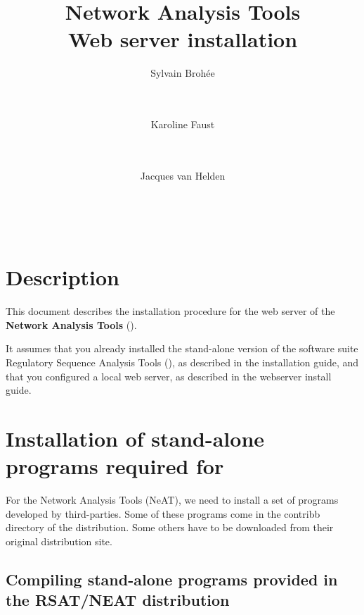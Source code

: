 \documentclass{book}
\begin{document}
\title{Network Analysis Tools \\
Web server installation}

\author{
	Sylvain Broh\'ee \\
	 \\
        \and \\
	Karoline Faust \\
	 \\
        \and \\
	Jacques van Helden \\
	\\
        \\
        \\
        \bigre
}


\maketitle

\newpage
\tableofcontents
\newpage

\section*{Description}

This document describes the installation procedure for the web server
of the \textbf{Network Analysis Tools} (\neat).

It assumes that you already installed the stand-alone version of the
software suite Regulatory Sequence Analysis Tools (\RSAT), as
described in the \RSAT installation guide, and that you configured a
local web server, as described in the \RSAT webserver install guide.


\section{Installation of stand-alone programs required for \neat}


For the Network Analysis Tools (NeAT), we need to install a set of
programs developed by third-parties.  Some of these programs come in
the contribb directory of the \neat distribution. Some others have to
be downloaded from their original distribution site.

\subsection{Compiling stand-alone programs provided in the RSAT/NEAT distribution}
\end{document}
